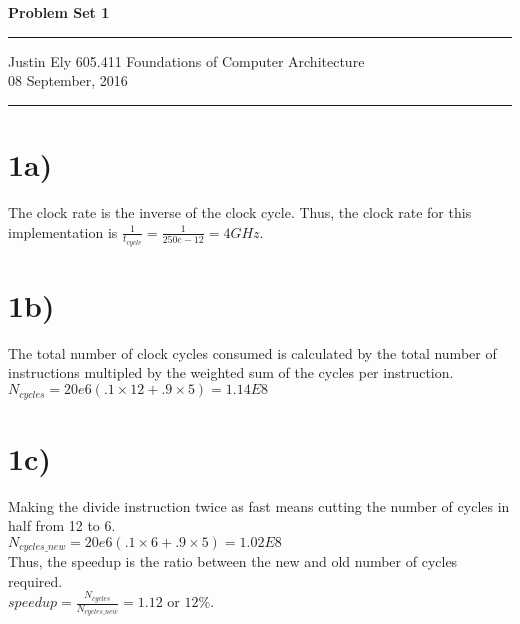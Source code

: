 \documentclass[a4paper,11pt]{article}
\begin{document}
\begin{flushright}

\vspace{1.1cm}

{\bf\Huge Problem Set 1}

\rule{0.25\linewidth}{0.5pt}

\vspace{0.5cm}
Justin Ely
\linebreak
\newline
\footnotesize{605.411 Foundations of Computer Architecture \\}
\vspace{0.5cm}
08 September, 2016
\end{flushright}

\noindent\rule{\linewidth}{1.0pt}


\section*{1a)}
The clock rate is the inverse of the clock cycle.  Thus, the clock rate for this implementation is $\frac{1}{t_{cycle}} = \frac{1}{250e-12} = 4GHz$.

\section*{1b)}
The total number of clock cycles consumed is calculated by the total number of instructions multipled by the weighted sum of the cycles per instruction.\\

\noindent $N_{cycles} = 20e6 (.1 \times 12 + .9 \times 5) = 1.14E8 $ 

\section*{1c)}
Making the divide instruction twice as fast means cutting the number of cycles in half from 12 to 6. \\

\noindent $N_{cycles\_new} = 20e6 (.1 \times 6 + .9 \times 5) = 1.02E8 $  \\

Thus, the speedup is the ratio between the new and old number of cycles required. \\

\noindent $speedup = \frac{N_{cycles}}{N_{cycles\_new}} = 1.12$ or $12\%$. 
\end{document}
